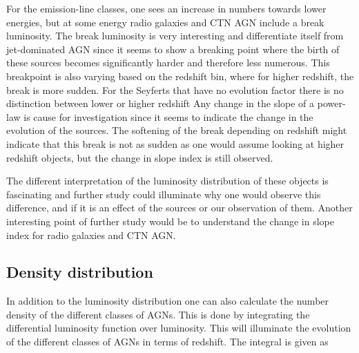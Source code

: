 For the emission-line classes, one sees an increase in numbers towards lower energies, but at some energy radio galaxies and CTN AGN include a break luminosity. The break luminosity is very interesting and differentiate itself 
from jet-dominated AGN since it seems to show 
a breaking point where the birth of these sources becomes significantly harder and therefore less numerous. 
This breakpoint is also varying based on the redshift bin, where for higher redshift, the break is more sudden. For the Seyferts that have no evolution factor there is no distinction between lower or higher redshift
Any change in the slope of a power-law is cause for investigation since it seems to indicate the change in the evolution of the sources. The softening of the break depending on redshift 
might indicate that this break is not as sudden as one would assume looking at higher redshift objects, but the change in slope index is still observed. 

The different interpretation of the luminosity distribution of these objects is fascinating and further study could illuminate why one would observe this difference, and if it is an effect of the sources or our observation of them.
Another interesting point of further study would be to understand the change in slope index for radio galaxies and CTN AGN. 






\subsection{Density distribution}

In addition to the luminosity distribution one can also calculate the number density of the different classes of AGNs. This is done by integrating the
differential luminosity function over luminosity. This will illuminate the evolution of the different classes of AGNs in terms of redshift. The integral is given as

